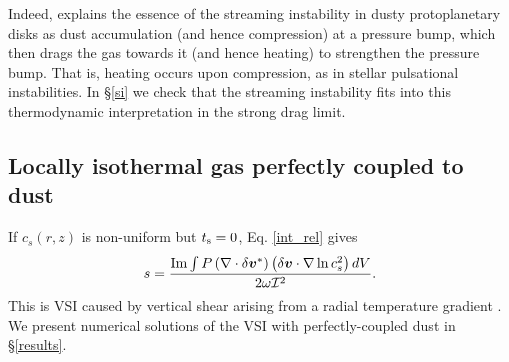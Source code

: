 Indeed, \cite{jacquet11} explains the essence of the streaming 
instability in dusty protoplanetary disks as dust accumulation
(and hence compression) at a pressure bump, which then drags the 
gas towards it (and hence heating) to strengthen the pressure
bump. That is, heating occurs upon compression, as in stellar  
pulsational instabilities. In \S\ref{si} we check that the
streaming instability fits into this thermodynamic interpretation in
the strong drag limit.  



\subsection{Locally isothermal gas perfectly coupled to dust}\label{dusty_vsi_int}
If $c_s(r,z)$ is non-uniform but $t_\mathrm{s}=0$, Eq. \ref{int_rel} 
gives  
\begin{align}
  s = \frac{\operatorname{Im}\int P
    \left(\nabla\cdot\delta\bm{v}^*\right)\left(\delta\bm{v}\cdot\nabla\ln{c_s^2}\right)dV}{2\omega\mathcal{I}^2}. \label{vsi_check} 
\end{align} 
This is VSI caused by vertical shear arising from a radial
temperature gradient \citep{nelson13,barker15,lin15}. We present 
numerical solutions of the VSI with perfectly-coupled dust in \S\ref{results}. 
